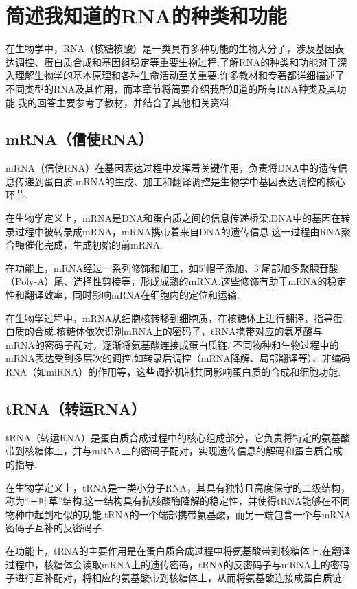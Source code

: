 \section{简述我知道的RNA的种类和功能}

在生物学中，RNA（核糖核酸）是一类具有多种功能的生物大分子，涉及基因表达调控、蛋白质合成和基因组稳定等重要生物过程.了解RNA的种类和功能对于深入理解生物学的基本原理和各种生命活动至关重要.许多教材和专著都详细描述了不同类型的RNA及其作用，而本章节将简要介绍我所知道的所有RNA种类及其功能.我的回答主要参考了教材\cite{2019基因组学}，并结合了其他相关资料.

\subsection{mRNA（信使RNA）}
mRNA（信使RNA）在基因表达过程中发挥着关键作用，负责将DNA中的遗传信息传递到蛋白质.mRNA的生成、加工和翻译调控是生物学中基因表达调控的核心环节.

在生物学定义上，mRNA是DNA和蛋白质之间的信息传递桥梁.DNA中的基因在转录过程中被转录成mRNA，mRNA携带着来自DNA的遗传信息.这一过程由RNA聚合酶催化完成，生成初始的前mRNA.

在功能上，mRNA经过一系列修饰和加工，如5'帽子添加、3'尾部加多聚腺苷酸（Poly-A）尾、选择性剪接等，形成成熟的mRNA.这些修饰有助于mRNA的稳定性和翻译效率，同时影响mRNA在细胞内的定位和运输.

在生物学过程中，mRNA从细胞核转移到细胞质，在核糖体上进行翻译，指导蛋白质的合成.核糖体依次识别mRNA上的密码子，tRNA携带对应的氨基酸与mRNA的密码子配对，逐渐将氨基酸连接成蛋白质链.
不同物种和生物过程中的mRNA表达受到多层次的调控.如转录后调控（mRNA降解、局部翻译等）、非编码RNA（如miRNA）的作用等，这些调控机制共同影响蛋白质的合成和细胞功能.


\subsection{tRNA（转运RNA）}
tRNA（转运RNA）是蛋白质合成过程中的核心组成部分，它负责将特定的氨基酸带到核糖体上，并与mRNA上的密码子配对，实现遗传信息的解码和蛋白质合成的指导.

在生物学定义上，tRNA是一类小分子RNA，其具有独特且高度保守的二级结构，称为“三叶草”结构.这一结构具有抗核酸酶降解的稳定性，并使得tRNA能够在不同物种中起到相似的功能.tRNA的一个端部携带氨基酸，而另一端包含一个与mRNA密码子互补的反密码子.

在功能上，tRNA的主要作用是在蛋白质合成过程中将氨基酸带到核糖体上.在翻译过程中，核糖体会读取mRNA上的遗传密码，tRNA的反密码子与mRNA上的密码子进行互补配对，将相应的氨基酸带到核糖体上，从而将氨基酸连接成蛋白质链.

